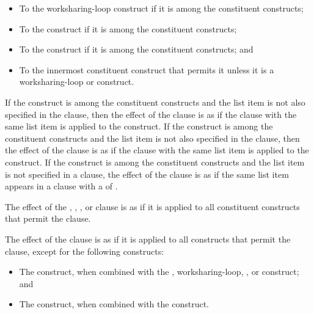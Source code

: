 \begin{itemize}
\item To the worksharing-loop construct if it is among the constituent constructs;
\item To the  construct if it is among the constituent constructs;
\item To the  construct if it is among the constituent constructs; and
\item To the innermost constituent construct that permits it unless it is a
      worksharing-loop or  construct.
\end{itemize}

If the  construct is among the constituent constructs and the
list item is not also specified in the  clause, then the 
effect of the  clause is as if the  clause 
with the same list item is applied to the  construct. If the 
 construct is among the constituent constructs and the list item 
is not also specified in the  clause, then the effect of the
 clause is as if the  clause with the same list 
item is applied to the  construct. If the  construct 
is among the constituent constructs and the list item is not specified in a 
 clause, the effect of the  clause is as if the same 
list item appears in a  clause with a  of .

The effect of the , , , or  
clause is as if it is applied to all constituent constructs that permit the clause.

The effect of the  clause is as if it is applied to all 
constructs that permit the clause, except for the following constructs:

\begin{itemize}
\item The  construct, when combined with the , worksharing-loop,
      , or  construct; and
\item The  construct,  when combined with the  construct.
\end{itemize}

